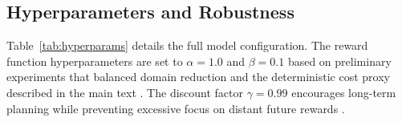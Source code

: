 \documentclass[11pt]{article}
\begin{document}
\subsection{Hyperparameters and Robustness}
\label{sec:hyperparams}

\begin{table}[t]
  \centering
  \small
  \caption{Hyperparameters used in all experiments.}
  \label{tab:hyperparams}
\end{table}

Table~\ref{tab:hyperparams} details the full model configuration. The reward function hyperparameters are set to $\alpha = 1.0$ and $\beta = 0.1$ based on preliminary experiments that balanced domain reduction and the deterministic cost proxy described in the main text \citep{sutton2018reinforcement,schulman2017proximal}. The discount factor $\gamma = 0.99$ encourages long-term planning while preventing excessive focus on distant future rewards \citep{schulman2017proximal,silver2017alphago}.
\end{document}
